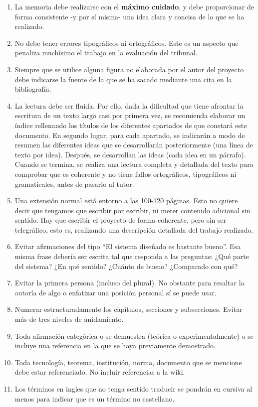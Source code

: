 \begin{enumerate}
	\item La memoria debe realizarse con el \textbf{máximo cuidado}, y debe proporcionar de forma consistente -y por sí misma- una idea clara y concisa de lo que se ha realizado. 
	\item No debe tener errores tipográficos ni ortográficos. Este es un aspecto que penaliza muchísimo el trabajo en la evaluación del tribunal. 
	\item Siempre que se utilice alguna figura no elaborada por el autor del proyecto debe indicarse la fuente de la que se ha sacado mediante una cita en la bibliografía. 
	\item La lectura debe ser fluida. Por ello, dada la dificultad que tiene afrontar la escritura de un texto largo casi por primera vez, se recomienda elaborar un índice rellenando los títulos de los diferentes apartados de que constará este documento. En segundo lugar, para cada apartado, se indicarán a modo de resumen las diferentes ideas que se desarrollarán posteriormente (una línea de texto por idea). Después, se desarrollan las ideas (cada idea en un párrafo). Cuando se termina, se realiza una lectura completa y detallada del texto para comprobar que es coherente y no tiene fallos ortográficos, tipográficos ni gramaticales, antes de pasarlo al tutor. 
	\item Una extensión normal está entorno a las 100-120 páginas. Esto no quiere decir que tengamos que escribir por escribir, ni meter contenido adicional sin sentido. Hay que escribir el proyecto de forma coherente, pero sin ser telegráfico, esto es, realizando una descripción detallada del trabajo realizado. 
	\item Evitar afirmaciones del tipo “El sistema diseñado es bastante bueno”. Esa misma frase debería ser escrita tal que responda a las preguntas: ¿Qué parte del sistema? ¿En qué sentido? ¿Cuánto de bueno? ¿Comparado con qué?
	\item Evitar la primera persona (incluso del plural). No obstante para resaltar la autoría de algo o enfatizar una posición personal sí se puede usar.
	\item Numerar estructuradamente los capítulos, secciones y subsecciones. Evitar más de tres niveles de anidamiento. 
	\item Toda afirmación categórica o se demuestra (teórica o experimentalmente)  o se incluye una referencia en la que se haya previamente demostrado.
	\item Toda tecnología, teorema, institución, norma, documento que se mencione debe estar referenciado. No incluir referencias a la wiki.
	\item Los términos en ingles que no tenga sentido traducir se pondrán en cursiva al menos para indicar que es un término no castellano.
	 

\end{enumerate}

